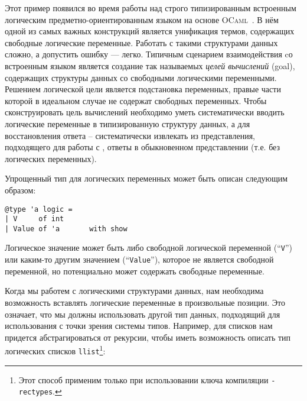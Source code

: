 Этот пример появился во время работы над строго типизированным встроенным логическим предметно-ориентированным языком на основе \textsc{OCaml}~\cite{OCanren}. 
В нём одной из самых важных конструкций является унификация термов, содержащих свободные логические переменные. Работать с такими структурами данных сложно, а допустить ошибку --- легко. 
Типичным сценарием взаимодействия  
cо встроенным языком 
является 
создание так называемых \emph{целей вычислений} (goal), содержащих структуры данных со свободными логическими переменными.
Решением логической цели является подстановка переменных, правые части которой в идеальном случае не содержат свободных переменных. 
Чтобы сконструировать цель вычислений необходимо уметь систематически вводить логические переменные в типизированную структуру данных,  а для восстановления ответа -- систематически извлекать из представления, подходящего для работы с \OCanren{}, ответы в обыкновенном
представлении (т.е. без логических переменных).

Упрощенный тип для логических переменных может быть описан следующим образом:

\begin{lstlisting}
@type 'a logic =
| V     of int
| Value of 'a       with show
\end{lstlisting}
Логическое значение может быть либо свободной логической переменной (``\lstinline{V}'') или каким-то другим значением (``\lstinline{Value}''), которое не является свободной переменной, но потенциально может содержать свободные переменные.
\begin{comment}

Чтобы преобразовывать в и из логических значений, можно воспользоваться следующими функциями:

\begin{lstlisting}
let lift x = Value x

let reify  = function
| V     _ -> invalid_arg "Free variable"
| Value x -> x
\end{lstlisting}

Функция ``\lstinline{reify}'' бросает исключение для свободных переменных, так как в присутствии вхождений свободных переменных
логическое значение нельзя рассматривать как обыкновенную (нелогическую) структуру данных.
\end{comment}


Когда мы работем с логическими структурами данных, нам необходима возможность вставлять логические переменные в произвольные позиции.
Это означает, что мы должны использовать другой тип данных, подходящий для использования 
с точки зрения системы типов. Например,
для списков нам придется абстрагироваться от рекурсии, чтобы иметь возможность описать тип логических списков \lstinline{llist}\footnote{Этот способ применим только при использовании ключа компиляции \texttt{-rectypes}.}:

